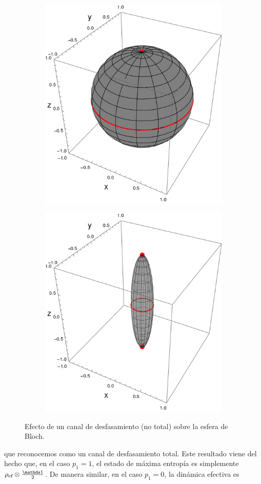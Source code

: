 \begin{figure}[ht!]
  \centering
  \begin{subfigure}{0.5\textwidth}
    \centering
    \includegraphics[width=0.6\linewidth]{chapter3/figures_toy/sphere_swapcontraction_t=0.0_z=0.9_p=0.9.png}
  \end{subfigure}%
  \begin{subfigure}{0.5\textwidth}
    \centering
    \includegraphics[width=0.6\linewidth]{chapter3/figures_toy/sphere_PF_t=1.0_z=0.8_p=0.6.png}
  \end{subfigure}
  \caption{Efecto de un canal de desfasamiento (no total) sobre la esfera de Bloch.}\label{fig:PhaseFlip}
\end{figure}
que reconocemos como un canal de desfasamiento total. Este resultado viene del hecho que, en el caso $p_{1}=1$, el estado de máxima entropía es simplemente $\rho_{\ef}\otimes\frac{\Id}{2}$. De manera similar, en el caso $p_{1}=0$, la dinámica efectiva es
